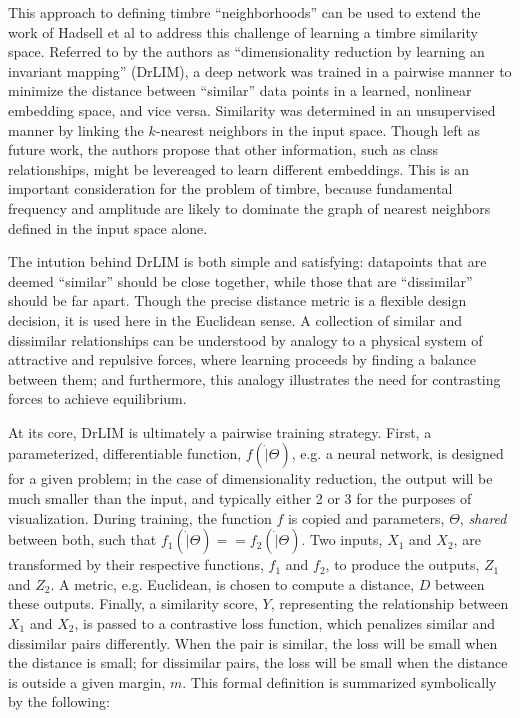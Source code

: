 This approach to defining timbre ``neighborhoods'' can be used to extend the work of Hadsell et al \cite{Hadsell2007} to address this challenge of learning a timbre similarity space.
Referred to by the authors as ``dimensionality reduction by learning an invariant mapping'' (DrLIM), a deep network was trained in a pairwise manner to minimize the distance between ``similar'' data points in a learned, nonlinear embedding space, and vice versa.
Similarity was determined in an unsupervised manner by linking the $k$-nearest neighbors in the input space.
Though left as future work, the authors propose that other information, such as class relationships, might be levereaged to learn different embeddings.
This is an important consideration for the problem of timbre, because fundamental frequency and amplitude are likely to dominate the graph of nearest neighbors defined in the input space alone.

The intution behind DrLIM is both simple and satisfying: datapoints that are deemed ``similar'' should be close together, while those that are ``dissimilar'' should be far apart.
Though the precise distance metric is a flexible design decision, it is used here in the Euclidean sense.
A collection of similar and dissimilar relationships can be understood by analogy to a physical system of attractive and repulsive forces, where learning proceeds by finding a balance between them; and furthermore, this analogy illustrates the need for contrasting forces to achieve equilibrium.

At its core, DrLIM is ultimately a pairwise training strategy.
First, a parameterized, differentiable function, $f(\dot | \Theta)$, e.g. a neural network, is designed for a given problem; in the case of dimensionality reduction, the output will be much smaller than the input, and typically either 2 or 3 for the purposes of visualization.
During training, the function $f$ is copied and parameters, $\Theta$, \emph{shared} between both, such that $f_1(\dot | \Theta) == f_2(\dot | \Theta)$.
Two inputs, $X_1$ and $X_2$, are transformed by their respective functions, $f_1$ and $f_2$, to produce the outputs, $Z_1$ and $Z_2$.
A metric, e.g. Euclidean, is chosen to compute a distance, $D$ between these outputs.
Finally, a similarity score, $Y$, representing the relationship between $X_1$ and $X_2$, is passed to a contrastive loss function, which penalizes similar and dissimilar pairs differently.
When the pair is similar, the loss will be small when the distance is small; for dissimilar pairs, the loss will be small when the distance is outside a given margin, $m$.
This formal definition is summarized symbolically by the following:


